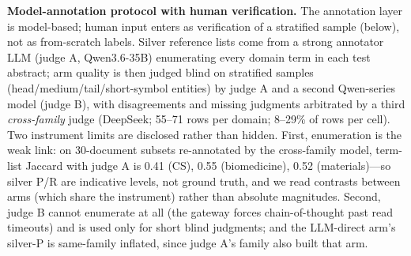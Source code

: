 \documentclass[preprint,12pt]{elsarticle}
\begin{document}
\textbf{Model-annotation protocol with human verification.} The
annotation layer is model-based; human input enters as verification
of a stratified sample (below), not as from-scratch labels.
Silver reference lists come from a strong annotator LLM (judge A,
Qwen3.6-35B) enumerating every domain term in each test abstract; arm
quality is then judged blind on stratified samples
(head/medium/tail/short-symbol entities) by judge A and a second
Qwen-series model (judge B), with disagreements and missing judgments
arbitrated by a third \emph{cross-family} judge (DeepSeek; 55--71 rows
per domain; 8--29\% of rows per cell). Two instrument limits are
disclosed rather than hidden.
First, enumeration is the weak link: on 30-document subsets
re-annotated by the cross-family model, term-list Jaccard with judge A
is 0.41 (CS), 0.55 (biomedicine), 0.52 (materials)---so silver P/R are
indicative levels, not ground truth, and we read contrasts between arms
(which share the instrument) rather than absolute magnitudes. Second,
judge B cannot enumerate at all (the gateway forces chain-of-thought
past read timeouts) and is used only for short blind judgments; and the
LLM-direct arm's silver-P is same-family inflated, since judge A's
family also built that arm.
\end{document}

